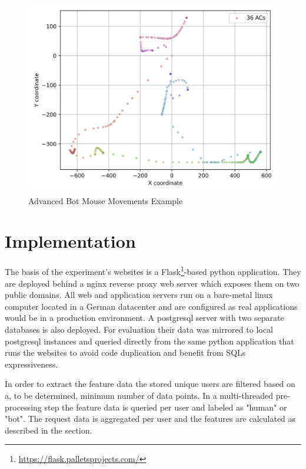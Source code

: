 \documentclass[
    fontsize=12pt,
    headings=small,
    parskip=half,           %
    bibliography=totoc,
    numbers=noenddot,       %
    open=any,               %
    final,                   %
    table
]{scrreprt}
\begin{document}
\begin{figure}[h]
    \includegraphics[width=\textwidth]{figures/bot_mouse_heatmap.png}
    \caption{Advanced Bot Mouse Movements Example}
    \label{fig:bot_mouse_heatmap}
\end{figure}



\section{Implementation}

The basis of the experiment's websites is a Flask\footnote{\url{https://flask.palletsprojects.com/}}-based python application. They are deployed behind a nginx reverse proxy web server which exposes them on two public domains. All web and application servers run on a bare-metal linux computer located in a German datacenter and are configured as real applications would be in a production environment. A postgresql server with two separate databases is also deployed. For evaluation their data was mirrored to local postgresql instances and queried directly from the same python application that runs the websites to avoid code duplication and benefit from SQLs expressiveness.

In order to extract the feature data the stored unique users are filtered based on a, to be determined, minimum number of data points. In a multi-threaded pre-processing step the feature data is queried per user and labeled as "human" or "bot". The request data is aggregated per user and the features are calculated as described in the  section.
\end{document}

